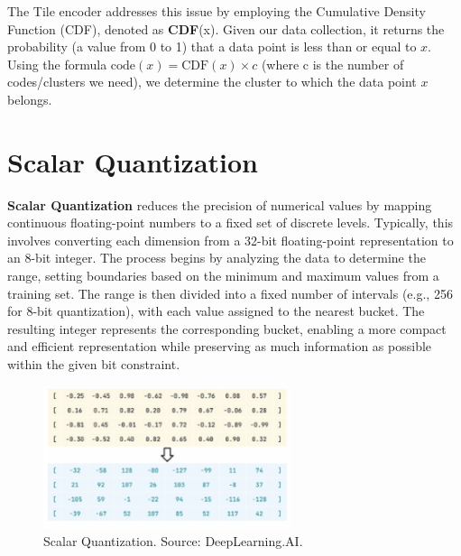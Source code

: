 The Tile encoder addresses this issue by employing the Cumulative Density Function (CDF), denoted as \textbf{CDF}(x). Given our data collection, it returns the probability (a value from 0 to 1) that a data point is less than or equal to \(x\). Using the formula \(\text{code}(x) = \text{CDF}(x) \times c\) (where c is the number of codes/clusters we need), we determine the cluster to which the data point \(x\) belongs. 


\section{Scalar Quantization}
\textbf{Scalar Quantization} reduces the precision of numerical values by mapping continuous floating-point numbers to a fixed set of discrete levels. Typically, this involves converting each dimension from a 32-bit floating-point representation to an 8-bit integer. The process begins by analyzing the data to determine the range, setting boundaries based on the minimum and maximum values from a training set. The range is then divided into a fixed number of intervals (e.g., 256 for 8-bit quantization), with each value assigned to the nearest bucket. The resulting integer represents the corresponding bucket, enabling a more compact and efficient representation while preserving as much information as possible within the given bit constraint.
\begin{figure}[h]
    \centering
    \includegraphics[width=0.65\textwidth]{IMAGES/immagine_2025-02-27_123316646.png}
    \caption[Scalar Quantization.]{Scalar Quantization. Source: DeepLearning.AI.\footnotemark[1]}
    \label{fig:SQ}
\end{figure}


